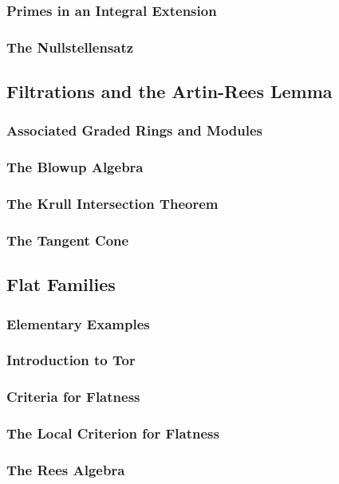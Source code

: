 \subsubsection{Primes in an Integral Extension}
\subsubsection{The Nullstellensatz}

\subsection{Filtrations and the Artin-Rees Lemma}
\subsubsection{Associated Graded Rings and Modules}
\subsubsection{The Blowup Algebra}
\subsubsection{The Krull Intersection Theorem}
\subsubsection{The Tangent Cone}

\subsection{Flat Families}
\subsubsection{Elementary Examples}
\subsubsection{Introduction to Tor}
\subsubsection{Criteria for Flatness}
\subsubsection{The Local Criterion for Flatness}
\subsubsection{The Rees Algebra}

